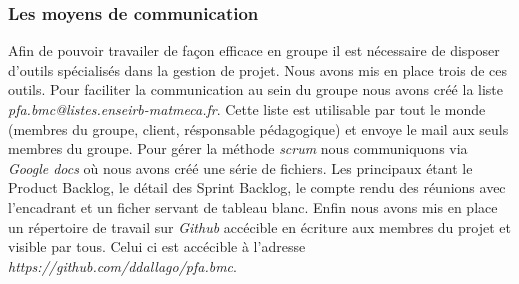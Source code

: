 \subsubsection*{Les moyens de communication}
Afin de pouvoir travailer de façon efficace en groupe il est nécessaire de disposer d'outils spécialisés dans la gestion de projet.
Nous avons mis en place trois de ces outils.
Pour faciliter la communication au sein du groupe nous avons créé la liste \textit{pfa.bmc@listes.enseirb-matmeca.fr}. Cette liste est utilisable par tout le monde (membres du groupe, client, résponsable pédagogique) et envoye le mail aux seuls membres du groupe.
Pour gérer la méthode \textit{scrum} nous communiquons via \textit{Google docs} où nous avons créé une série de fichiers. Les principaux étant le Product Backlog, le détail des Sprint Backlog, le compte rendu des réunions avec l'encadrant et un ficher servant de tableau blanc.
Enfin nous avons mis en place un répertoire de travail sur \textit{Github} accécible en écriture aux membres du projet et visible par tous. Celui ci est accécible à l'adresse \textit{https://github.com/ddallago/pfa.bmc}.

